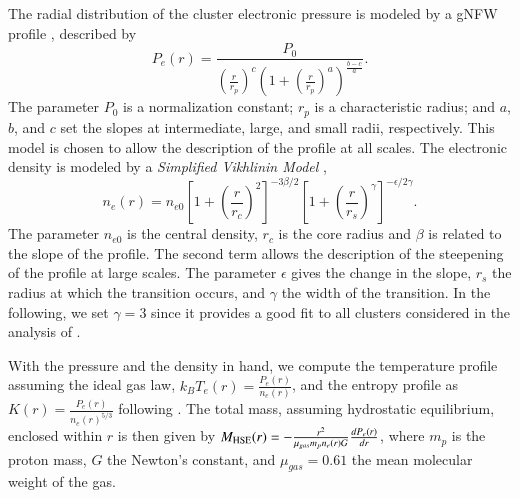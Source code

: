\documentclass[twocolumn,traditabstract]{aa}
\begin{document}
The radial distribution of the cluster electronic pressure is modeled by a gNFW profile \citep{nagai2007}, described by
\begin{equation}
	P_e(r) = \frac{P_0}{\left(\frac{r}{r_p}\right)^c \left(1+\left(\frac{r}{r_p}\right)^a\right)^{\frac{b-c}{a}}}.
\label{eq:gNFW}
\end{equation}
The parameter $P_0$ is a normalization constant; $r_p$ is a characteristic radius; and $a$, $b$, and $c$ set the slopes at intermediate, large, and small radii, respectively. This model is chosen to allow the description of the profile at all scales. The electronic density is modeled by a \emph{Simplified Vikhlinin Model} \citep{vikhlinin2006},
\begin{equation}
	n_e(r) = n_{e0} \left[1+\left(\frac{r}{r_c}\right)^2 \right]^{-3 \beta /2} \left[ 1+\left(\frac{r}{r_s}\right)^{\gamma} \right]^{-\epsilon/2 \gamma}.
\label{eq:SVM}
\end{equation}
The parameter $n_{e0}$ is the central density, $r_c$ is the core radius and $\beta$ is related to the slope of the profile. The second term allows the description of the steepening of the profile at large scales. The parameter $\epsilon$ gives the change in the slope, $r_s$ the radius at which the transition occurs, and $\gamma$ the width of the transition. In the following, we set $\gamma = 3$ since it provides a good fit to all clusters considered in the analysis of \cite{vikhlinin2006}.

With the pressure and the density in hand, we compute the temperature profile assuming the ideal gas law, $k_B T_e(r) = \frac{P_e(r)}{n_e(r)}$, and the entropy profile as $K(r) =  \frac{P_e(r)}{n_e(r)^{5/3}}$ following \cite{voit2005}. The total mass, assuming hydrostatic equilibrium, enclosed within $r$ is then given by $M_{\rm HSE}(r) = -\frac{r^2}{\mu_{gas} m_p n_e(r) G} \frac{dP_e(r)}{dr}$, where $m_p$ is the proton mass, $G$ the Newton’s constant, and $\mu_{gas} = 0.61$ the mean molecular weight of the gas.
\end{document}

